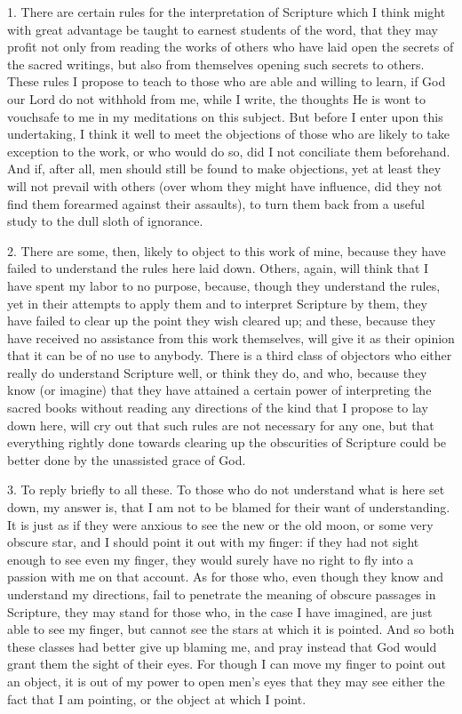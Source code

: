 1. There are certain rules for the interpretation of Scripture which I think might with great advantage be taught to earnest students of the word, that they may profit not only from reading the works of others who have laid open the secrets of the sacred writings, but also from themselves opening such secrets to others. These rules I propose to teach to those who are able and willing to learn, if God our Lord do not withhold from me, while I write, the thoughts He is wont to vouchsafe to me in my meditations on this subject. But before I enter upon this undertaking, I think it well to meet the objections of those who are likely to take exception to the work, or who would do so, did I not conciliate them beforehand. And if, after all, men should still be found to make objections, yet at least they will not prevail with others (over whom they might have influence, did they not find them forearmed against their assaults), to turn them back from a useful study to the dull sloth of ignorance.

2. There are some, then, likely to object to this work of mine, because they have failed to understand the rules here laid down. Others, again, will think that I have spent my labor to no purpose, because, though they understand the rules, yet in their attempts to apply them and to interpret Scripture by them, they have failed to clear up the point they wish cleared up; and these, because they have received no assistance from this work themselves, will give it as their opinion that it can be of no use to anybody. There is a third class of objectors who either really do understand Scripture well, or think they do, and who, because they know (or imagine) that they have attained a certain power of interpreting the sacred books without reading any directions of the kind that I propose to lay down here, will cry out that such rules are not necessary for any one, but that everything rightly done towards clearing up the obscurities of Scripture could be better done by the unassisted grace of God.

3. To reply briefly to all these. To those who do not understand what is here set down, my answer is, that I am not to be blamed for their want of understanding. It is just as if they were anxious to see the new or the old moon, or some very obscure star, and I should point it out with my finger: if they had not sight enough to see even my finger, they would surely have no right to fly into a passion with me on that account. As for those who, even though they know and understand my directions, fail to penetrate the meaning of obscure passages in Scripture, they may stand for those who, in the case I have imagined, are just able to see my finger, but cannot see the stars at which it is pointed. And so both these classes had better give up blaming me, and pray instead that God would grant them the sight of their eyes. For though I can move my finger to point out an object, it is out of my power to open men’s eyes that they may see either the fact that I am pointing, or the object at which I point.

